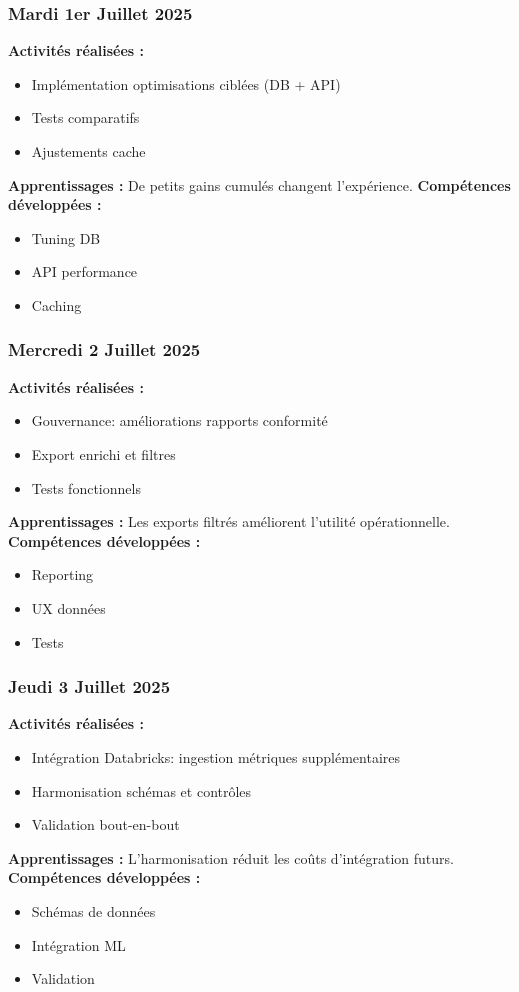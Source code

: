 \documentclass[12pt,a4paper]{article}
\begin{document}
\subsubsection{Mardi 1er Juillet 2025}
\textbf{Activités réalisées :}
\begin{itemize}
    \item Implémentation optimisations ciblées (DB + API)
    \item Tests comparatifs
    \item Ajustements cache
\end{itemize}
\textbf{Apprentissages :} De petits gains cumulés changent l'expérience.
\textbf{Compétences développées :}
\begin{itemize}
    \item Tuning DB
    \item API performance
    \item Caching
\end{itemize}

\subsubsection{Mercredi 2 Juillet 2025}
\textbf{Activités réalisées :}
\begin{itemize}
    \item Gouvernance: améliorations rapports conformité
    \item Export enrichi et filtres
    \item Tests fonctionnels
\end{itemize}
\textbf{Apprentissages :} Les exports filtrés améliorent l'utilité opérationnelle.
\textbf{Compétences développées :}
\begin{itemize}
    \item Reporting
    \item UX données
    \item Tests
\end{itemize}

\subsubsection{Jeudi 3 Juillet 2025}
\textbf{Activités réalisées :}
\begin{itemize}
    \item Intégration Databricks: ingestion métriques supplémentaires
    \item Harmonisation schémas et contrôles
    \item Validation bout-en-bout
\end{itemize}
\textbf{Apprentissages :} L'harmonisation réduit les coûts d'intégration futurs.
\textbf{Compétences développées :}
\begin{itemize}
    \item Schémas de données
    \item Intégration ML
    \item Validation
\end{itemize}
\end{document}
